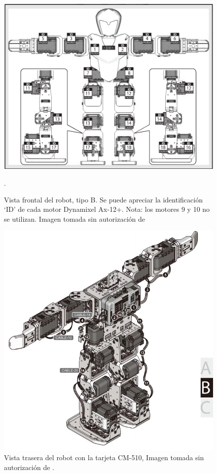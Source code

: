 \begin{figure}[hbtp]
\centering
\includegraphics[scale=0.3]{imagenes/Robot.png}
\caption{Vista frontal del robot, tipo B. Se puede apreciar la identificación ‘ID’ de cada motor Dynamixel Ax-12+. Nota: los motores 9 y 10 no se utilizan. Imagen tomada sin autorizaci\'on de \cite{manualRobot}}.

\label{fig:frontal}
\end{figure}

\begin{figure}[hbtp]
\centering
\includegraphics[scale=0.3]{imagenes/RobotTrasero.png}
\caption{Vista trasera del robot con la tarjeta CM-510, Imagen tomada sin autorizaci\'on de \cite{manualRobot}.}
\label{fig:trasera1}
\end{figure}


